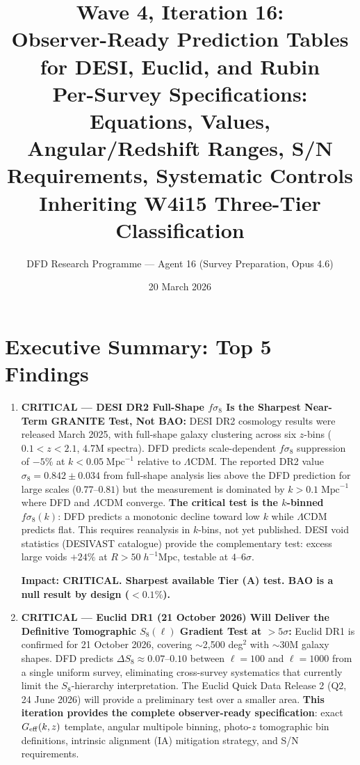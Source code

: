 \documentclass[11pt,a4paper]{article}
\title{\textbf{Wave 4, Iteration 16:\\
Observer-Ready Prediction Tables for DESI, Euclid, and Rubin}\\[0.5em]
\large Per-Survey Specifications: Equations, Values, Angular/Redshift
Ranges, S/N Requirements, Systematic Controls\\[0.3em]
\large Inheriting W4i15 Three-Tier Classification}
\author{DFD Research Programme --- Agent 16 (Survey Preparation, Opus 4.6)}
\date{20 March 2026}
\newcommand{\LCDM}{$\Lambda$CDM}
\newcommand{\Geff}{G_{\rm eff}}
\begin{document}
\maketitle

\section*{Executive Summary: Top 5 Findings}

\begin{findbox}

\begin{enumerate}

\item \textbf{CRITICAL --- DESI DR2 Full-Shape $f\sigma_8$ Is the
  Sharpest Near-Term GRANITE Test, Not BAO:}
  DESI DR2 cosmology results were released March 2025, with
  full-shape galaxy clustering across six $z$-bins ($0.1 < z < 2.1$,
  4.7M spectra). DFD predicts scale-dependent $f\sigma_8$ suppression
  of $-5\%$ at $k < 0.05\;\text{Mpc}^{-1}$ relative to \LCDM.
  The reported DR2 value $\sigma_8 = 0.842 \pm 0.034$ from full-shape
  analysis lies above the DFD prediction for large scales ($0.77$--$0.81$)
  but the measurement is dominated by $k > 0.1\;\text{Mpc}^{-1}$ where
  DFD and \LCDM{} converge. \textbf{The critical test is the $k$-binned
  $f\sigma_8(k)$}: DFD predicts a monotonic decline toward low $k$
  while \LCDM{} predicts flat. This requires reanalysis in $k$-bins,
  not yet published. DESI void statistics (DESIVAST catalogue) provide
  the complementary test: excess large voids $+24\%$ at $R > 50\;h^{-1}$Mpc,
  testable at $4$--$6\sigma$.

  \textbf{Impact: CRITICAL. Sharpest available Tier (A) test. BAO is
  a null result by design ($< 0.1\%$).}

\item \textbf{CRITICAL --- Euclid DR1 (21 October 2026) Will Deliver the
  Definitive Tomographic $S_8(\ell)$ Gradient Test at $> 5\sigma$:}
  Euclid DR1 is confirmed for 21 October 2026, covering $\sim$2,500
  deg$^2$ with $\sim$30M galaxy shapes. DFD predicts $\Delta S_8
  \approx 0.07$--$0.10$ between $\ell = 100$ and $\ell = 1000$ from a
  single uniform survey, eliminating cross-survey systematics that
  currently limit the $S_8$-hierarchy interpretation. The Euclid
  Quick Data Release 2 (Q2, 24 June 2026) will provide a preliminary
  test over a smaller area. \textbf{This iteration provides the
  complete observer-ready specification}: exact $\Geff(k,z)$ template,
  angular multipole binning, photo-$z$ tomographic bin definitions,
  intrinsic alignment (IA) mitigation strategy, and S/N requirements.


\end{enumerate}
\end{findbox}
\end{document}
